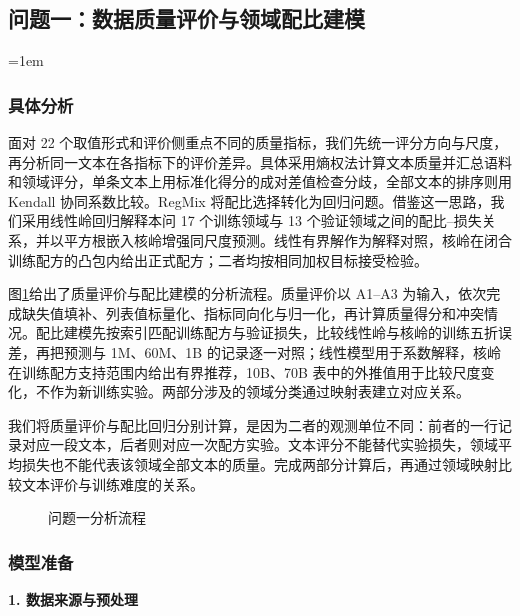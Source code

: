 \subsection{问题一：数据质量评价与领域配比建模}
\begingroup
{}
\emergencystretch=1em

\subsubsection{具体分析}

面对 22 个取值形式和评价侧重点不同的质量指标，我们先统一评分方向与尺度，再分析同一文本在各指标下的评价差异。具体采用熵权法计算文本质量并汇总语料和领域评分，单条文本上用标准化得分的成对差值检查分歧，全部文本的排序则用 Kendall 协同系数比较。RegMix 将配比选择转化为回归问题\cite{liu2024regmix}。借鉴这一思路，我们采用线性岭回归解释本问 17 个训练领域与 13 个验证领域之间的配比--损失关系，并以平方根嵌入核岭增强同尺度预测。线性有界解作为解释对照，核岭在闭合训练配方的凸包内给出正式配方；二者均按相同加权目标接受检验。

图\ref{fig:q1_workflow}给出了质量评价与配比建模的分析流程。质量评价以 A1--A3 为输入，依次完成缺失值填补、列表值标量化、指标同向化与归一化，再计算质量得分和冲突情况。配比建模先按索引匹配训练配方与验证损失，比较线性岭与核岭的训练五折误差，再把预测与 1M、60M、1B 的记录逐一对照；线性模型用于系数解释，核岭在训练配方支持范围内给出有界推荐，10B、70B 表中的外推值用于比较尺度变化，不作为新训练实验。两部分涉及的领域分类通过映射表建立对应关系。

我们将质量评价与配比回归分别计算，是因为二者的观测单位不同：前者的一行记录对应一段文本，后者则对应一次配方实验。文本评分不能替代实验损失，领域平均损失也不能代表该领域全部文本的质量。完成两部分计算后，再通过领域映射比较文本评价与训练难度的关系。

\begin{figure}[htbp]
  \centering
  
  \caption{问题一分析流程}
  \label{fig:q1_workflow}
\end{figure}

\subsubsection{模型准备}

\textbf{1. 数据来源与预处理}\par\nopagebreak[4]

